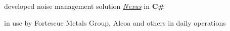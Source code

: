 \documentclass[a4paper]{style}
\begin{document}
\begin{minipage}[t]{0.5\textwidth}
\vspace{-1pt}
\begin{tightitemize}
    \item developed noise management solution \href{https://www.vanguardtech.com.au/products/nexus/}{\textit{Nexus}} in \textbf{C\#}
        \vspace{2pt}
        \begin{tightitemize}
            \item in use by Fortescue Metals Group, Alcoa and others in daily operations
        \end{tightitemize}
\end{tightitemize}

\sectionspace{}

\end{minipage} %
\hfill
%
%
\end{document}
